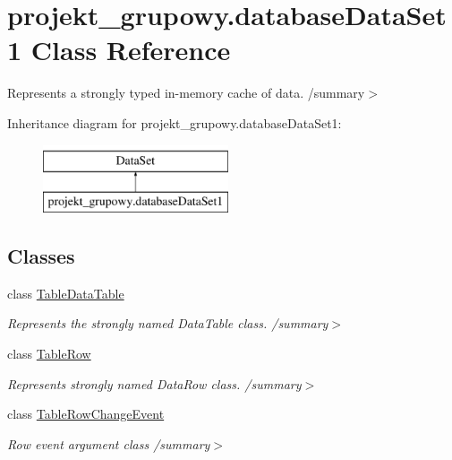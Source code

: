 \hypertarget{classprojekt__grupowy_1_1database_data_set1}{}\section{projekt\+\_\+grupowy.\+database\+Data\+Set1 Class Reference}
\label{classprojekt__grupowy_1_1database_data_set1}


Represents a strongly typed in-\/memory cache of data. /summary$>$  


Inheritance diagram for projekt\+\_\+grupowy.\+database\+Data\+Set1\+:\begin{figure}[H]
\begin{center}
\leavevmode
\includegraphics[height=2.000000cm]{classprojekt__grupowy_1_1database_data_set1}
\end{center}
\end{figure}
\subsection*{Classes}
\begin{DoxyCompactItemize}
\item 
class \hyperlink{classprojekt__grupowy_1_1database_data_set1_1_1_table_data_table}{Table\+Data\+Table}
\begin{DoxyCompactList}\small\item\em Represents the strongly named Data\+Table class. /summary$>$ \end{DoxyCompactList}\item 
class \hyperlink{classprojekt__grupowy_1_1database_data_set1_1_1_table_row}{Table\+Row}
\begin{DoxyCompactList}\small\item\em Represents strongly named Data\+Row class. /summary$>$ \end{DoxyCompactList}\item 
class \hyperlink{classprojekt__grupowy_1_1database_data_set1_1_1_table_row_change_event}{Table\+Row\+Change\+Event}
\begin{DoxyCompactList}\small\item\em Row event argument class /summary$>$ \end{DoxyCompactList}\end{DoxyCompactItemize}
